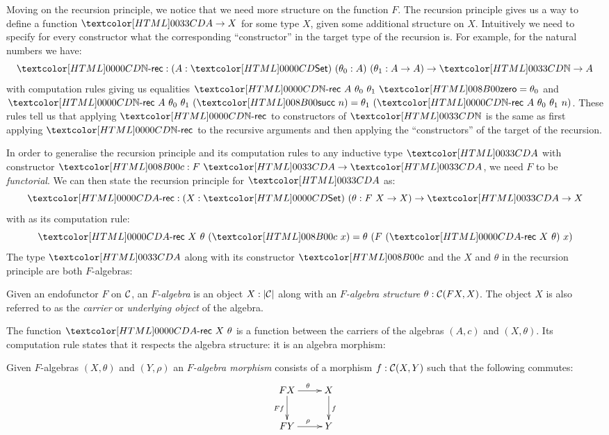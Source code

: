 Moving on the recursion principle, we notice that we need more
structure on the function $F$. The recursion principle gives us a way
to define a function $\Aty \to X$ for some type $X$, given some
additional structure on $X$. Intuitively we need to specify for every
constructor what the corresponding ``constructor'' in the target type
of the recursion is. For example, for the natural numbers we have:
$$
\natrec : (A : \Set)\ (\theta_0 : A)\ (\theta_1 : A \to A) \to \natty \to A
$$
with computation rules giving us equalities
$\natrec\ A\ \theta_0\ \theta_1\ \natzero = \theta_0$ and
$\natrec\ A\ \theta_0\ \theta_1\ (\natsucc\ n) = \theta_1\ (\natrec\
A\ \theta_0\ \theta_1\ n)$.
These rules tell us that applying $\natrec$ to constructors of
$\natty$ is the same as first applying $\natrec$ to the recursive
arguments and then applying the ``constructors'' of the target of the
recursion.

In order to generalise the recursion principle and its computation
rules to any inductive type $\Aty$ with constructor
$\Ac : F\ \Aty \to \Aty$, we need $F$ to be \emph{functorial}. We can
then state the recursion principle for $\Aty$ as:
$$
\Arec : (X : \Set)\ (\theta : F\ X \to X) \to \Aty \to X
$$
with as its computation rule:
$$
\Arec\ X\ \theta\ (\Ac\ x) = \theta\ (F\ (\Arec\ X\ \theta)\ x)
$$
The type $\Aty$ along with its constructor $\Ac$ and the $X$ and
$\theta$ in the recursion principle are both $F$-algebras:

\begin{definition}
  Given an endofunctor $F$ on $\mathcal{C}$, an \emph{$F$-algebra} is an
  object $X : | \mathcal{C} |$ along with an \emph{$F$-algebra structure}
  $\theta : \mathcal{C}(F X, X)$. The object $X$ is also referred to as the
  \emph{carrier} or \emph{underlying object} of the algebra.
\end{definition}

The function $\Arec\ X\ \theta$ is a function between the carriers of
the algebras $(A,c)$ and $(X,\theta)$. Its computation rule states
that it respects the algebra structure: it is an algebra morphism:

\begin{definition}
  Given $F$-algebras $(X,\theta)$ and $(Y,\rho)$ an \emph{$F$-algebra
    morphism} consists of a morphism $f : \mathcal{C}(X,Y)$ such that the
  following commutes:
  $$
  \xymatrix{
    FX \ar[r]^{\theta} \ar[d]_{Ff} &X \ar[d]^{f} \\
    FY \ar[r]^{\rho} &Y
  }
  $$
\end{definition}

